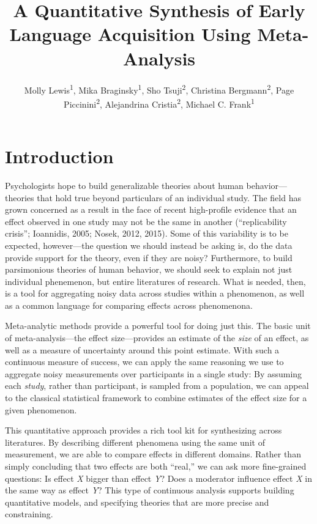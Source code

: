 \documentclass[american,floatsintext,man]{apa6}
\title{A Quantitative Synthesis of Early Language Acquisition Using
Meta-Analysis}
\author{
          Molly Lewis\textsuperscript{1},
          Mika Braginsky\textsuperscript{1},
          Sho Tsuji\textsuperscript{2},
          Christina Bergmann\textsuperscript{2},
          Page Piccinini\textsuperscript{2},
          Alejandrina Cristia\textsuperscript{2},
          Michael C. Frank\textsuperscript{1}  }
\affiliation{
    \vspace{0.5cm}
          \textsuperscript{1} Department Psychology, Stanford University\\
          \textsuperscript{2} Laboratoire de Sciences Cognitives et Psycholinguistique, ENS  }
\begin{document}
\maketitle



\section{Introduction}\label{introduction}

Psychologists hope to build generalizable theories about human
behavior---theories that hold true beyond particulars of an individual
study. The field has grown concerned as a result in the face of recent
high-profile evidence that an effect observed in one study may not be
the same in another (``replicability crisis''; Ioannidis, 2005; Nosek,
2012, 2015). Some of this variability is to be expected, however---the
question we should instead be asking is, do the data provide support for
the theory, even if they are noisy? Furthermore, to build parsimonious
theories of human behavior, we should seek to explain not just
individual phenemenon, but entire literatures of research. What is
needed, then, is a tool for aggregating noisy data across studies within
a phenomenon, as well as a common language for comparing effects across
phenomenona.

Meta-analytic methods provide a powerful tool for doing just this. The
basic unit of meta-analysis---the effect size---provides an estimate of
the \emph{size} of an effect, as well as a measure of uncertainty around
this point estimate. With such a continuous measure of success, we can
apply the same reasoning we use to aggregate noisy measurements over
participants in a single study: By assuming each \emph{study}, rather
than participant, is sampled from a population, we can appeal to the
classical statistical framework to combine estimates of the effect size
for a given phenomenon.

This quantitative approach provides a rich tool kit for synthesizing
across literatures. By describing different phenomena using the same
unit of measurement, we are able to compare effects in different
domains. Rather than simply concluding that two effects are both
``real,'' we can ask more fine-grained questions: Is effect \emph{X}
bigger than effect \emph{Y}? Does a moderator influence effect \emph{X}
in the same way as effect \emph{Y}? This type of continuous analysis
supports building quantitative models, and specifying theories that are
more precise and constraining.
\end{document}
